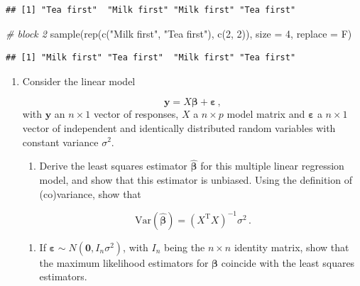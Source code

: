 \documentclass[
]{book}
\newenvironment{Shaded}{\begin{snugshade}}{\end{snugshade}}
\newcommand{\AttributeTok}[1]{\textcolor[rgb]{0.77,0.63,0.00}{#1}}
\newcommand{\CommentTok}[1]{\textcolor[rgb]{0.56,0.35,0.01}{\textit{#1}}}
\newcommand{\DecValTok}[1]{\textcolor[rgb]{0.00,0.00,0.81}{#1}}
\newcommand{\FunctionTok}[1]{\textcolor[rgb]{0.00,0.00,0.00}{#1}}
\newcommand{\NormalTok}[1]{#1}
\newcommand{\StringTok}[1]{\textcolor[rgb]{0.31,0.60,0.02}{#1}}
\providecommand{\tightlist}{%
  \setlength{\itemsep}{0pt}\setlength{\parskip}{0pt}}
\theoremstyle{definition}
\theoremstyle{definition}
\theoremstyle{definition}
\theoremstyle{definition}
\theoremstyle{remark}
\begin{document}
\begin{enumerate}
\begin{verbatim}
## [1] "Tea first"  "Milk first" "Milk first" "Tea first"
\end{verbatim}

\begin{Shaded}
\begin{Highlighting}[]
\CommentTok{\# block 2}
\FunctionTok{sample}\NormalTok{(}\FunctionTok{rep}\NormalTok{(}\FunctionTok{c}\NormalTok{(}\StringTok{"Milk first"}\NormalTok{, }\StringTok{"Tea first"}\NormalTok{), }\FunctionTok{c}\NormalTok{(}\DecValTok{2}\NormalTok{, }\DecValTok{2}\NormalTok{)), }\AttributeTok{size =} \DecValTok{4}\NormalTok{, }\AttributeTok{replace =}\NormalTok{ F)}
\end{Highlighting}
\end{Shaded}

\begin{verbatim}
## [1] "Milk first" "Tea first"  "Milk first" "Tea first"
\end{verbatim}
\end{enumerate}

\begin{enumerate}
\def\labelenumi{\arabic{enumi}.}
\setcounter{enumi}{1}
\item
  Consider the linear model

  \[\boldsymbol{y}= X\boldsymbol{\beta}+ \boldsymbol{\varepsilon}\,,\]
  with \(\boldsymbol{y}\) an \(n\times 1\) vector of responses, \(X\) a \(n\times p\) model matrix and \(\boldsymbol{\varepsilon}\) a \(n\times 1\) vector of independent and identically distributed random variables with constant variance \(\sigma^2\).

  \begin{enumerate}
  \def\labelenumii{\alph{enumii}.}
  \tightlist
  \item
    Derive the least squares estimator \(\hat{\boldsymbol{\beta}}\) for this multiple linear regression model, and show that this estimator is unbiased. Using the definition of (co)variance, show that
  \end{enumerate}

  \[\mbox{Var}(\hat{\boldsymbol{\beta}}) = \left(X^{\mathrm{T}}X\right)^{-1}\sigma^2\,.\]

  \begin{enumerate}
  \def\labelenumii{\alph{enumii}.}
  \setcounter{enumii}{1}
  \tightlist
  \item
    If \(\boldsymbol{\varepsilon}\sim N (\boldsymbol{0},I_n\sigma^2)\), with \(I_n\) being the \(n\times n\) identity matrix, show that the maximum likelihood estimators for \(\boldsymbol{\beta}\) coincide with the least squares estimators.
  \end{enumerate}
\end{enumerate}
\end{document}
